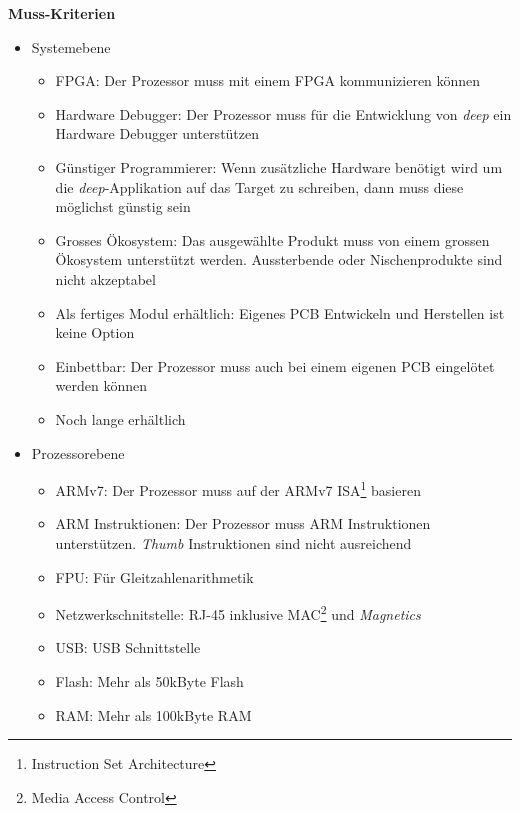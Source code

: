 \textbf{Muss-Kriterien}
\begin{itemize}
\item Systemebene
	\begin{itemize}
	\item FPGA: Der Prozessor muss mit einem FPGA kommunizieren können
	\item Hardware Debugger: Der Prozessor muss für die Entwicklung von \textit{deep} ein Hardware Debugger unterstützen 
	\item Günstiger Programmierer: Wenn zusätzliche Hardware benötigt wird um die \textit{deep}-Applikation auf das Target zu schreiben, dann muss diese möglichst günstig sein
	\item Grosses Ökosystem: Das ausgewählte Produkt muss von einem grossen Ökosystem unterstützt werden. Aussterbende oder Nischenprodukte sind nicht akzeptabel
	\item Als fertiges Modul erhältlich: Eigenes PCB Entwickeln und Herstellen ist keine Option
	\item Einbettbar: Der Prozessor muss auch bei einem eigenen PCB eingelötet werden können
	\item Noch lange erhältlich
	\end{itemize}
\item Prozessorebene
	\begin{itemize}
	\item ARMv7: Der Prozessor muss auf der ARMv7 ISA\footnote{Instruction Set Architecture} basieren
	\item ARM Instruktionen: Der Prozessor muss ARM Instruktionen unterstützen. \textit{Thumb} Instruktionen sind nicht ausreichend
	\item FPU: Für Gleitzahlenarithmetik
	\item Netzwerkschnitstelle: RJ-45 inklusive MAC\footnote{Media Access Control} und \textit{Magnetics}
	\item USB: USB Schnittstelle
	\item Flash: Mehr als 50kByte Flash
	\item RAM: Mehr als 100kByte RAM
	\end{itemize}
\end{itemize}



